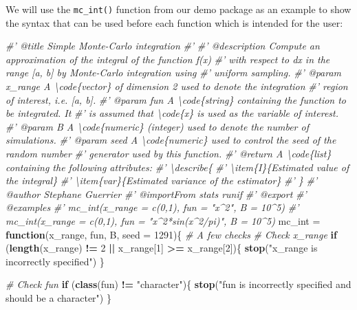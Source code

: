 \documentclass[12pt,]{krantz}
\newenvironment{Shaded}{\begin{snugshade}}{\end{snugshade}}
\newcommand{\KeywordTok}[1]{\textcolor[rgb]{0.27,0.27,0.27}{\textbf{#1}}}
\newcommand{\DataTypeTok}[1]{\textcolor[rgb]{0.27,0.27,0.27}{#1}}
\newcommand{\DecValTok}[1]{\textcolor[rgb]{0.06,0.06,0.06}{#1}}
\newcommand{\StringTok}[1]{\textcolor[rgb]{0.5,0.5,0.5}{#1}}
\newcommand{\CommentTok}[1]{\textcolor[rgb]{0.37,0.37,0.37}{\textit{#1}}}
\newcommand{\ControlFlowTok}[1]{\textcolor[rgb]{0.27,0.27,0.27}{\textbf{#1}}}
\newcommand{\OperatorTok}[1]{\textcolor[rgb]{0.43,0.43,0.43}{\textbf{#1}}}
\newcommand{\NormalTok}[1]{#1}
\begin{document}
We will use the \texttt{mc\_int()} function from our demo package as an
example to show the syntax that can be used before each function which
is intended for the user:

\begin{Shaded}
\begin{Highlighting}[]
\CommentTok{#' @title Simple Monte-Carlo integration}
\CommentTok{#'}
\CommentTok{#' @description Compute an approximation of the integral of the function f(x)}
\CommentTok{#' with respect to dx in the range [a, b] by Monte-Carlo integration using}
\CommentTok{#' uniform sampling.}
\CommentTok{#' @param x_range A \textbackslash{}code\{vector\} of dimension 2 used to denote the integration}
\CommentTok{#' region of interest, i.e. [a, b].}
\CommentTok{#' @param fun A \textbackslash{}code\{string\} containing the function to be integrated. It}
\CommentTok{#' is assumed that \textbackslash{}code\{x\} is used as the variable of interest.}
\CommentTok{#' @param B A \textbackslash{}code\{numeric\} (integer) used to denote the number of simulations.}
\CommentTok{#' @param seed A \textbackslash{}code\{numeric\} used to control the seed of the random number}
\CommentTok{#' generator used by this function.}
\CommentTok{#' @return A \textbackslash{}code\{list\} containing the following attributes:}
\CommentTok{#' \textbackslash{}describe\{}
\CommentTok{#'      \textbackslash{}item\{I\}\{Estimated value of the integral\}}
\CommentTok{#'      \textbackslash{}item\{var\}\{Estimated variance of the estimator\}}
\CommentTok{#' \}}
\CommentTok{#' @author Stephane Guerrier}
\CommentTok{#' @importFrom stats runif}
\CommentTok{#' @export}
\CommentTok{#' @examples}
\CommentTok{#' mc_int(x_range = c(0,1), fun = "x^2", B = 10^5)}
\CommentTok{#' mc_int(x_range = c(0,1), fun = "x^2*sin(x^2/pi)", B = 10^5)}
\NormalTok{mc_int =}\StringTok{ }\ControlFlowTok{function}\NormalTok{(x_range, fun, B, }\DataTypeTok{seed =} \DecValTok{1291}\NormalTok{)\{}
  \CommentTok{# A few checks}
  \CommentTok{# Check x_range}
  \ControlFlowTok{if}\NormalTok{ (}\KeywordTok{length}\NormalTok{(x_range) }\OperatorTok{!=}\StringTok{ }\DecValTok{2} \OperatorTok{||}\StringTok{ }\NormalTok{x_range[}\DecValTok{1}\NormalTok{] }\OperatorTok{>=}\StringTok{ }\NormalTok{x_range[}\DecValTok{2}\NormalTok{])\{}
    \KeywordTok{stop}\NormalTok{(}\StringTok{"x_range is incorrectly specified"}\NormalTok{)}
\NormalTok{  \}}

  \CommentTok{# Check fun}
  \ControlFlowTok{if}\NormalTok{ (}\KeywordTok{class}\NormalTok{(fun) }\OperatorTok{!=}\StringTok{ "character"}\NormalTok{)\{}
    \KeywordTok{stop}\NormalTok{(}\StringTok{"fun is incorrectly specified and should be a character"}\NormalTok{)}
\NormalTok{  \}}


\end{Highlighting}
\end{Shaded}
\end{document}
